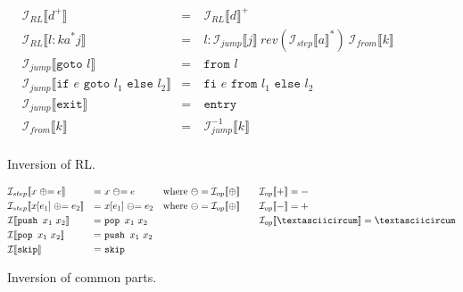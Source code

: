 \begin{figure}[H]
  $$\begin{aligned}
    & \mathcal{I}_{RL}\llbracket d^+\rrbracket & =\ & \mathcal{I}_{RL}\llbracket d\rrbracket^+\\
    & \mathcal{I}_{RL}\llbracket l : k a^* j\rrbracket & =\ & l: \mathcal{I}_{jump}\llbracket j\rrbracket\ rev(\mathcal{I}_{step}\llbracket a\rrbracket^*)\ \mathcal{I}_{from}\llbracket k\rrbracket\\
    & \mathcal{I}_{jump}\llbracket\texttt{goto }l\rrbracket & =\ & \texttt{from }l\\
    & \mathcal{I}_{jump}\llbracket\texttt{if }e\texttt{ goto }l_1\texttt{ else }l_2\rrbracket & =\ & \texttt{fi }e\texttt{ from }l_1\texttt{ else }l_2\\
    & \mathcal{I}_{jump}\llbracket\texttt{exit}\rrbracket & =\ & \texttt{entry}\\
    & \mathcal{I}_{from}\llbracket k\rrbracket & =\ & \mathcal{I}_{jump}^{-1}\llbracket k\rrbracket\\
  \end{aligned}$$
  \caption{Inversion of RL.}
  \label{fig:inversion_rl}
\end{figure}

\begin{figure}[H]
  $$\begin{aligned}
    & \mathcal{I}_{step}\llbracket x \mathrel{\oplus}= e\rrbracket & =\ & x \mathrel{\ominus}= e & & \text{where }\ominus = \mathcal{I}_{op}\llbracket\oplus\rrbracket & \quad & \mathcal{I}_{op}\llbracket +\rrbracket = -\\
    & \mathcal{I}_{step}\llbracket x[e_1] \mathrel{\oplus}= e_2\rrbracket & =\ & x[e_1] \mathrel{\ominus}= e_2 & & \text{where }\ominus = \mathcal{I}_{op}\llbracket\oplus\rrbracket & \quad & \mathcal{I}_{op}\llbracket -\rrbracket = +\\
    & \mathcal{I}\llbracket\texttt{push }x_1\ x_2\rrbracket & =\ & \texttt{pop }x_1\ x_2 & & & \quad & \mathcal{I}_{op}\llbracket \mathrm{\textasciicircum}\rrbracket = \mathrm{\textasciicircum}\\
    & \mathcal{I}\llbracket\texttt{pop }x_1\ x_2\rrbracket & =\ & \texttt{push }x_1\ x_2\\
    & \mathcal{I}\llbracket\texttt{skip}\rrbracket & =\ & \texttt{skip}\\
  \end{aligned}$$
  \caption{Inversion of common parts.}
  \label{fig:inversion_rl}
\end{figure}
